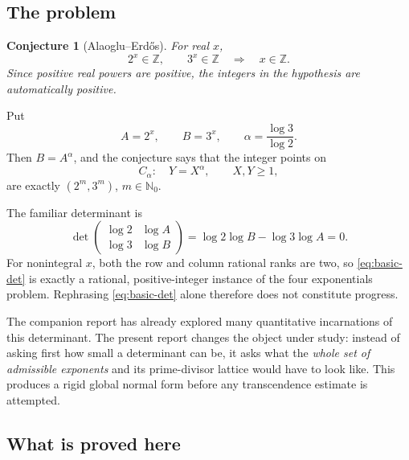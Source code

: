 \documentclass[11pt]{article}
\newtheorem{conjecture}[theorem]{Conjecture}
\theoremstyle{definition}
\newcommand{\Z}{\mathbb{Z}}
\newcommand{\N}{\mathbb{N}}
\begin{document}
\subsection{The problem}

\begin{conjecture}[Alaoglu--Erd\H{o}s]
For real \(x\),
\[
  2^x\in\Z,\qquad 3^x\in\Z
  \quad\Longrightarrow\quad x\in\Z.
\]
Since positive real powers are positive, the integers in the hypothesis are automatically positive.
\end{conjecture}

Put
\[
 A=2^x,\qquad B=3^x,
 \qquad \alpha=\frac{\log3}{\log2}.
\]
Then \(B=A^\alpha\), and the conjecture says that the integer points on
\[
  C_\alpha:\quad Y=X^\alpha,\qquad X,Y\ge1,
\]
are exactly \((2^m,3^m)\), \(m\in\N_0\).

The familiar determinant is
\begin{equation}\label{eq:basic-det}
 \det\begin{pmatrix}\log2&\log A\\[2pt]\log3&\log B\end{pmatrix}
 =\log2\log B-\log3\log A=0.
\end{equation}
For nonintegral \(x\), both the row and column rational ranks are two, so \eqref{eq:basic-det} is exactly a rational, positive-integer instance of the four exponentials problem.  Rephrasing \eqref{eq:basic-det} alone therefore does not constitute progress.

The companion report has already explored many quantitative incarnations of this determinant.  The present report changes the object under study: instead of asking first how small a determinant can be, it asks what the \emph{whole set of admissible exponents} and its prime-divisor lattice would have to look like.  This produces a rigid global normal form before any transcendence estimate is attempted.

\subsection{What is proved here}
\end{document}
